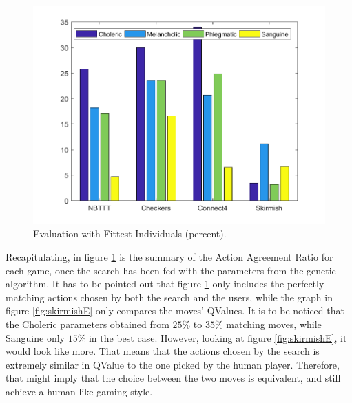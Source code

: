 \begin{figure}[H]
\centering
	\includegraphics[scale=0.6]{figure/eval/Tot}
    \caption{Evaluation with Fittest Individuals (percent).}
    \label{fig:tot}
\end{figure}
Recapitulating, in figure \ref{fig:tot} is the summary of the Action Agreement Ratio for each game, once the search has been fed with the parameters from the genetic algorithm. It has to be pointed out that figure \ref{fig:tot} only includes the perfectly matching actions chosen by both the search and the users, while the graph in figure \ref{fig:skirmishE} only compares the moves' QValues. It is to be noticed that the Choleric parameters obtained from $25\%$ to $35\%$ matching moves, while Sanguine only $15\%$ in the best case. However, looking at figure \ref{fig:skirmishE}, it would look like more. That means that the actions chosen by the search is extremely similar in QValue to the one picked by the human player. Therefore, that might imply that the choice between the two moves is equivalent, and still achieve a human-like gaming style. 
